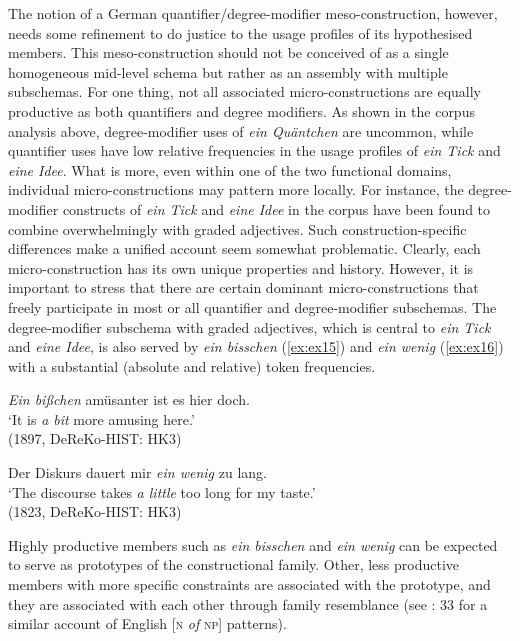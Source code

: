 \documentclass[output=paper]{langsci/langscibook}
\begin{document}
The notion of a German quantifier\slash degree\hyp{}modifier meso-construction, however, needs some refinement to do justice to the usage profiles of its hypothesised members. This meso-construction should not be conceived of as a single homogeneous mid-level schema but rather as an assembly with multiple subschemas. For one thing, not all associated micro\hyp{}constructions are equally productive as both quantifiers and degree modifiers. As shown in the corpus analysis above, degree\hyp{}modifier uses of \textit{ein Quäntchen} are uncommon, while quantifier uses have low relative frequencies in the usage profiles of \textit{ein Tick }and \textit{eine Idee}. What is more, even within one of the two functional domains, individual micro\hyp{}constructions may pattern more locally. For instance, the degree\hyp{}modifier constructs of \textit{ein Tick} and \textit{eine Idee} in the corpus have been found to combine overwhelmingly with graded adjectives. Such construction-specific differences make a unified account seem somewhat problematic. Clearly, each micro-construction has its own unique properties and history. However, it is important to stress that there are certain dominant micro\hyp{}constructions that freely participate in most or all quantifier and degree\hyp{}modifier subschemas. The degree\hyp{}modifier subschema with graded adjectives, which is central to \textit{ein Tick} and \textit{eine Idee}, is also served by \textit{ein bisschen} (\ref{ex:ex15}) and \textit{ein wenig} (\ref{ex:ex16}) with a substantial (absolute and relative) token frequencies.

\begin{exe}
	\ex \label{ex:ex15}\textit{Ein bißchen} amüsanter ist es hier doch. \\
`It is \textit{a bit} more amusing here.' \\ (1897, DeReKo-HIST: HK3) 

	\ex \label{ex:ex16} Der Diskurs dauert mir \textit{ein wenig} zu lang. \\ 
`The discourse takes \textit{a little} too long for my taste.' \\ (1823, DeReKo-HIST: HK3)
\end{exe}

Highly productive members such as \textit{ein bisschen} and \textit{ein wenig} can be expected to serve as prototypes of the constructional family. Other, less productive members with more specific constraints are associated with the prototype, and they are associated with each other through family resemblance (see \citealt{TraugottGrammaticalizationNPNP2008}: 33 for a similar account of English [\textsc{n} \textit{of} \textsc{np}] patterns). 
\end{document}
